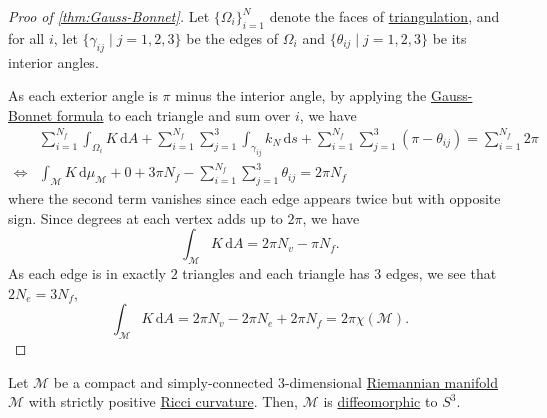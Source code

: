 \begin{proof}[Proo of \autoref{thm:Gauss-Bonnet}]
	Let \(\{ \Omega _i \}_{i=1}^N \) denote the faces of \hyperref[def:smooth-triangulation]{triangulation}, and for all \(i\), let \(\{ \gamma _{ij} \mid j = 1, 2, 3 \} \) be the edges of \(\Omega _i\) and \(\{ \theta _{ij} \mid j = 1, 2, 3 \} \) be its interior angles.

	As each exterior angle is \(\pi \) minus the interior angle, by applying the \hyperref[note:Gauss-Bonnet-formula]{Gauss-Bonnet formula} to each triangle and sum over \(i\), we have
	\[
		\begin{split}
			&\sum_{i=1}^{N_f} \int _{\Omega _i} K \,\mathrm{d} A
			+ \sum_{i=1}^{N_f} \sum_{j=1}^{3} \int _{\gamma _{ij}} k_N \,\mathrm{d} s
			+ \sum_{i=1}^{N_f} \sum_{j=1}^{3} (\pi - \theta _{ij})
			= \sum_{i=1}^{N_f} 2\pi\\
			\iff & \int _{\mathcal{M}} K \,\mathrm{d} \mu _{\mathcal{M} }
			+ 0
			+ 3\pi N_f
			- \sum_{i=1}^{N_f} \sum_{j=1}^{3} \theta _{ij}
			= 2\pi N_f
		\end{split}
	\]
	where the second term vanishes since each edge appears twice but with opposite sign. Since degrees at each vertex adds up to \(2\pi \), we have
	\[
		\int _{\mathcal{M} } K \,\mathrm{d} A = 2\pi N_v - \pi N_f.
	\]
	As each edge is in exactly \(2\) triangles and each triangle has \(3\) edges, we see that \(2 N_e = 3N_f\),
	\[
		\int _\mathcal{M} K \,\mathrm{d} A = 2 \pi N_v - 2\pi N_e + 2\pi N_f = 2\pi \chi (\mathcal{M} ).
	\]
\end{proof}

\begin{theorem}[Hamilton]\label{thm:Hamilton}
	Let \(\mathcal{M} \) be a compact and simply-connected \(3\)-dimensional \hyperref[def:Riemannian-manifold]{Riemannian manifold} \(\mathcal{M} \) with strictly positive \hyperref[def:Ricci-curvature]{Ricci curvature}. Then, \(\mathcal{M} \) is \hyperref[def:diffeomorphic]{diffeomorphic} to \(S^3\).
\end{theorem}